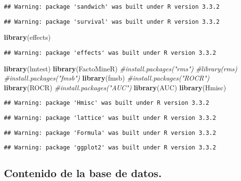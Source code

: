 \documentclass[]{article}
\newenvironment{Shaded}{\begin{snugshade}}{\end{snugshade}}
\newcommand{\KeywordTok}[1]{\textcolor[rgb]{0.13,0.29,0.53}{\textbf{#1}}}
\newcommand{\CommentTok}[1]{\textcolor[rgb]{0.56,0.35,0.01}{\textit{#1}}}
\newcommand{\NormalTok}[1]{#1}
\begin{document}
\begin{verbatim}
## Warning: package 'sandwich' was built under R version 3.3.2
\end{verbatim}

\begin{verbatim}
## Warning: package 'survival' was built under R version 3.3.2
\end{verbatim}

\begin{Shaded}
\begin{Highlighting}[]
\KeywordTok{library}\NormalTok{(effects)}
\end{Highlighting}
\end{Shaded}

\begin{verbatim}
## Warning: package 'effects' was built under R version 3.3.2
\end{verbatim}

\begin{Shaded}
\begin{Highlighting}[]
\KeywordTok{library}\NormalTok{(lmtest)}
\KeywordTok{library}\NormalTok{(FactoMineR)}
\CommentTok{#install.packages("rms")}
\CommentTok{#library(rms)}
\CommentTok{#install.packages("fmsb")}
\KeywordTok{library}\NormalTok{(fmsb)}
\CommentTok{#install.packages("ROCR")}
\KeywordTok{library}\NormalTok{(ROCR)}
\CommentTok{#install.packages("AUC")}
\KeywordTok{library}\NormalTok{(AUC)}
\KeywordTok{library}\NormalTok{(Hmisc)}
\end{Highlighting}
\end{Shaded}

\begin{verbatim}
## Warning: package 'Hmisc' was built under R version 3.3.2
\end{verbatim}

\begin{verbatim}
## Warning: package 'lattice' was built under R version 3.3.2
\end{verbatim}

\begin{verbatim}
## Warning: package 'Formula' was built under R version 3.3.2
\end{verbatim}

\begin{verbatim}
## Warning: package 'ggplot2' was built under R version 3.3.2
\end{verbatim}

\subsection{Contenido de la base de
datos.}\label{contenido-de-la-base-de-datos.}
\end{document}
